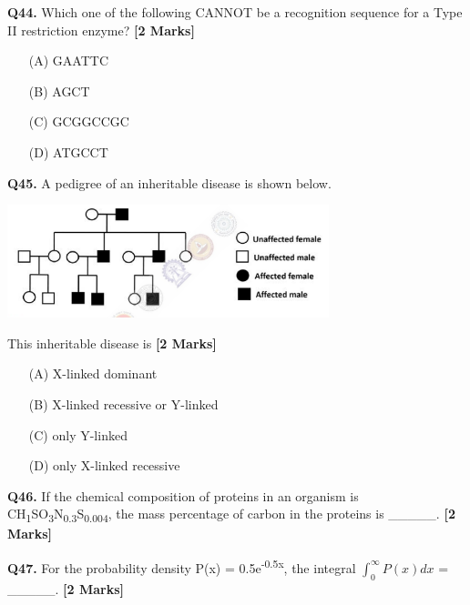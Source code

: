 \documentclass[11pt]{article}
\newcommand{\questionb}[2]{
    \noindent\textbf{Q#2.} #1 \hfill \textbf{[2 Marks]}
}
\begin{document}
\vspace{0.5cm}

\questionb{Which one of the following CANNOT be a recognition sequence for a Type II restriction enzyme?}{44}
\begin{enumerate}
    \item[(A)] GAATTC
    \item[(B)] AGCT  
    \item[(C)] GCGGCCGC
    \item[(D)] ATGCCT
\end{enumerate}

\vspace{0.5cm}

\questionb{A pedigree of an inheritable disease is shown below.

\begin{center}
\includegraphics[width=0.7\textwidth]{figures/45.png}
\end{center}

This inheritable disease is}{45}
\begin{enumerate}
    \item[(A)] X-linked dominant
    \item[(B)] X-linked recessive or Y-linked  
    \item[(C)] only Y-linked
    \item[(D)] only X-linked recessive
\end{enumerate}

\vspace{0.5cm}

\questionb{If the chemical composition of proteins in an organism is CH\textsubscript{1}SO\textsubscript{3}N\textsubscript{0.3}S\textsubscript{0.004}, the mass percentage of carbon in the proteins is \_\_\_\_\_.}{46}

\vspace{0.5cm}

\questionb{For the probability density P(x) = 0.5e\textsuperscript{-0.5x}, the integral $\int_{0}^{\infty} P(x)dx$ = \_\_\_\_\_.}{47}

\vspace{0.5cm}
\end{document}
